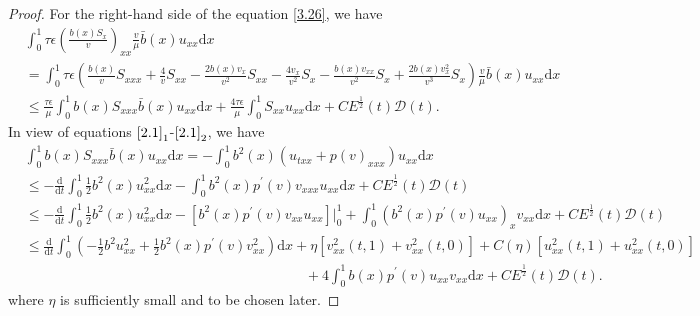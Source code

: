 \documentclass[10pt,a4paper]{amsart}
\newcommand{\dif}{\mathrm{d}}
\begin{document}
\begin{proof}
For the right-hand side of the equation \eqref{3.26}, we have
\begin{align*}
&\int_0^1 \tau \epsilon \left(\frac{b(x)S_x}{v}\right)_{xx} \frac{v}{\mu} \bar b(x)u_{xx}\dif x \\
&=\int_0^1 \tau \epsilon \left( \frac{b(x)}{v}S_{xxx}+\frac{4}{v} S_{xx}-\frac{2 b(x) v_x}{v^2}S_{xx}-\frac{4v_x}{v^2}S_x-\frac{b(x)v_{xx}}{v^2}S_x+\frac{2 b(x)v_x^2}{v^3} S_x\right)\frac{v}{\mu} \bar b(x)u_{xx}\dif x\\
&\le \frac{\tau \epsilon}{\mu} \int_0^1 b(x) S_{xxx} \bar b(x) u_{xx} \dif x +\frac{4\tau \epsilon}{\mu} \int_0^1 S_{xx} u_{xx} \dif x +CE^\frac{1}{2}(t)\mathcal D(t).
\end{align*}
In view of  equations $\eqref{2.1}_1$-$\eqref{2.1}_2$, we have
\begin{align*}
&\int_0^1 b(x) S_{xxx} \bar b(x) u_{xx}\dif x=-\int_0^1 b^2(x)(u_{txx}+p(v)_{xxx})u_{xx}\dif x\\
&\le -\frac{\dif}{\dif t}\int_0^1 \frac{1}{2}b^2(x) u_{xx}^2\dif x-\int_0^1 b^2(x)p^\prime(v) v_{xxx}u_{xx} \dif x+CE^\frac{1}{2}(t)\mathcal D(t)\\
&\le -\frac{\dif}{\dif t} \int_0^1 \frac{1}{2} b^2(x)u_{xx}^2 \dif x-\left[b^2(x)p^\prime(v) v_{xx}u_{xx} \right]\big|_0^1+\int_0^1 (b^2(x)p^\prime(v) u_{xx})_x v_{xx}\dif x +CE^\frac{1}{2}(t)\mathcal D(t)\\
&\le \frac{\dif}{\dif t} \int_0^1 (-\frac{1}{2} b^2 u_{xx}^2+\frac{1}{2} b^2(x)p^\prime(v) v_{xx}^2)\dif x+\eta[ v_{xx}^2(t,1)+v_{xx}^2(t,0)]+C(\eta) [u_{xx}^2(t,1)+u_{xx}^2(t,0)]\\
&\qquad\qquad\qquad\qquad\qquad\qquad\qquad\qquad\qquad\qquad+4\int_0^1 b(x)p^\prime(v) u_{xx}v_{xx}\dif x+CE^\frac{1}{2}(t)\mathcal D(t).
\end{align*}
where $\eta$ is sufficiently small and to be chosen later.
 

\end{proof}
\end{document}
